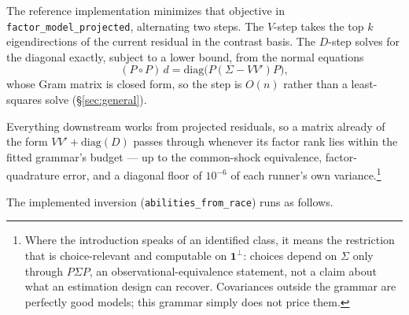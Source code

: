 \documentclass[11pt]{article}
\begin{document}
The reference implementation minimizes that objective in
\texttt{factor\_model\_projected}, alternating two steps. The $V$-step
takes the top $k$ eigendirections of the current residual in the contrast
basis. The $D$-step solves for the diagonal exactly, subject to a lower
bound, from the normal equations
\[
  (P\!\circ\!P)\,d=\mathrm{diag}\bigl(P(\Sigma-VV')P\bigr),
\]
whose Gram matrix is closed form, so the step is $O(n)$ rather than a
least-squares solve (\S\ref{sec:general}).

Everything downstream works from projected residuals, so a matrix
already of the form $VV'+\mathrm{diag}(D)$ passes through whenever its
factor rank lies within the fitted grammar's budget --- up to the
common-shock equivalence, factor-quadrature error, and a diagonal floor
of $10^{-6}$ of each runner's own variance.\footnote{Where
the introduction speaks of an identified class, it means the restriction
that is choice-relevant and computable on $\mathbf{1}^{\perp}$: choices
depend on $\Sigma$ only through $P\Sigma P$, an observational-equivalence
statement, not a claim about what an estimation design can recover.
Covariances outside the grammar are perfectly good models; this grammar
simply does not price them.}

The implemented inversion (\texttt{abilities\_from\_race}) runs as follows.

\begin{center}
\end{center}
\end{document}
